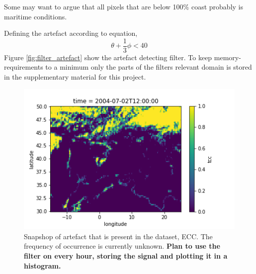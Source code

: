Some may want to argue that all pixels that are below 100\% coast probably is maritime conditions.

Defining the artefact according to equation, 
\begin{equation} \label{eq:artefact}
    \theta + \frac{1}{3}\phi < 40
\end{equation}
Figure \ref{fig:filter_artefact} show the artefact detecting filter. To keep memory-requirements to a minimum only the parts of the filters relevant domain is stored in the supplementary material for this project.

\begin{figure}
    \centering
    \includegraphics{Chapter4_Results/figurs/example_artefact.png}
    \caption[Artefact in European Cloud Cover dataset.]{Snapshop of artefact that is present in the dataset, ECC. The frequency of occurrence is currently unknown. \textbf{Plan to use the filter on every hour, storing the signal and plotting it in a histogram.}}
    \label{fig:example_artefact}
\end{figure}

